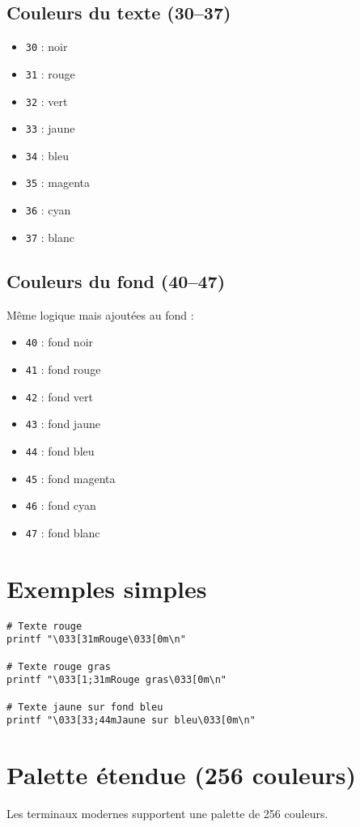 \documentclass[11pt,a4paper]{article}
\begin{document}
\subsection*{Couleurs du texte (30--37)}
\begin{itemize}
  \item \texttt{30} : noir
  \item \texttt{31} : rouge
  \item \texttt{32} : vert
  \item \texttt{33} : jaune
  \item \texttt{34} : bleu
  \item \texttt{35} : magenta
  \item \texttt{36} : cyan
  \item \texttt{37} : blanc
\end{itemize}

\subsection*{Couleurs du fond (40--47)}
Même logique mais ajoutées au fond :
\begin{itemize}
  \item \texttt{40} : fond noir
  \item \texttt{41} : fond rouge
  \item \texttt{42} : fond vert
  \item \texttt{43} : fond jaune
  \item \texttt{44} : fond bleu
  \item \texttt{45} : fond magenta
  \item \texttt{46} : fond cyan
  \item \texttt{47} : fond blanc
\end{itemize}

\section{Exemples simples}
\begin{lstlisting}
# Texte rouge
printf "\033[31mRouge\033[0m\n"

# Texte rouge gras
printf "\033[1;31mRouge gras\033[0m\n"

# Texte jaune sur fond bleu
printf "\033[33;44mJaune sur bleu\033[0m\n"
\end{lstlisting}

\section{Palette étendue (256 couleurs)}
Les terminaux modernes supportent une palette de 256 couleurs.
\end{document}
